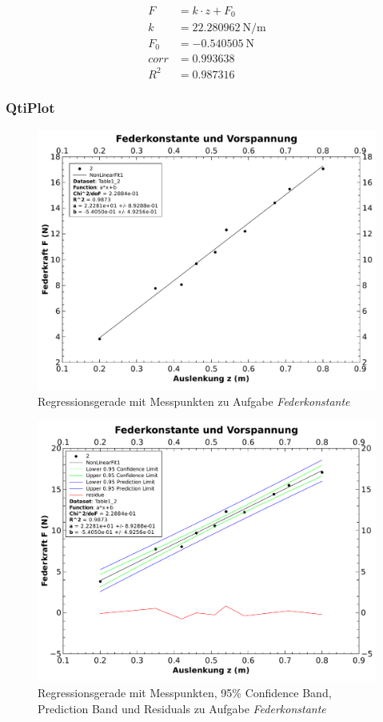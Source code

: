 \begin{align*}
    F    & = k \cdot z + F_0 \\
    k    & = \SI{22.280962}{\newton\per\meter} \\
    F_0  & = \SI{-0.540505}{\newton} \\
    corr & = 0.993638 \\
    R^2  & = 0.987316
\end{align*}

\subsubsection{QtiPlot}
\begin{figure}[th!]
    \centering
    \includegraphics[width=.8\textwidth]{images/aufgabe3-1.pdf}
    \caption{Regressionsgerade mit Messpunkten zu Aufgabe \emph{Federkonstante}}
    \label{fig:federkonstante1}
\end{figure}
\begin{figure}[th!]
    \centering
    \includegraphics[width=.8\textwidth]{images/aufgabe3-2.pdf}
    \caption{Regressionsgerade mit Messpunkten, 95\% Confidence Band, Prediction Band und Residuals zu Aufgabe \emph{Federkonstante}}
    \label{fig:federkonstante2}
\end{figure}
